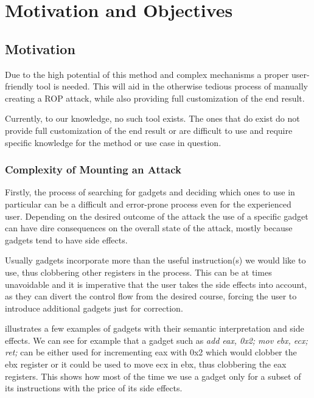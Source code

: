 \chapter{Motivation and Objectives}
\label{chapter:motivation}

\section{Motivation}
\label{sec:motiv}

Due to the high potential of this method and complex mechanisms a proper user-friendly tool is needed. This will aid in the otherwise tedious process of manually creating a ROP attack, while also providing full customization of the end result.

Currently, to our knowledge, no such tool exists. The ones that do exist do not provide full customization of the end result or are difficult to use and require specific knowledge for the method or use case in question.

\subsection{Complexity of Mounting an Attack}

Firstly, the process of searching for gadgets and deciding which ones to use in particular can be a difficult and error-prone process even for the experienced user. Depending on the desired outcome of the attack the use of a specific gadget can have dire consequences on the overall state of the attack, mostly because gadgets tend to have side effects.

Usually gadgets incorporate more than the useful instruction(s) we would like to use, thus clobbering other registers in the process. This can be at times unavoidable and it is imperative that the user takes the side effects into account, as they can divert the control flow from the desired course, forcing the user to introduce additional gadgets just for correction.

 illustrates a few examples of gadgets with their semantic interpretation and side effects. We can see for example that a gadget such as \textit{add eax, 0x2; mov ebx, ecx; ret;} can be either used for incrementing eax with 0x2 which would clobber the ebx register or it could be used to move ecx in ebx, thus clobbering the eax registers. This shows how most of the time we use a gadget only for a subset of its instructions with the price of its side effects.

